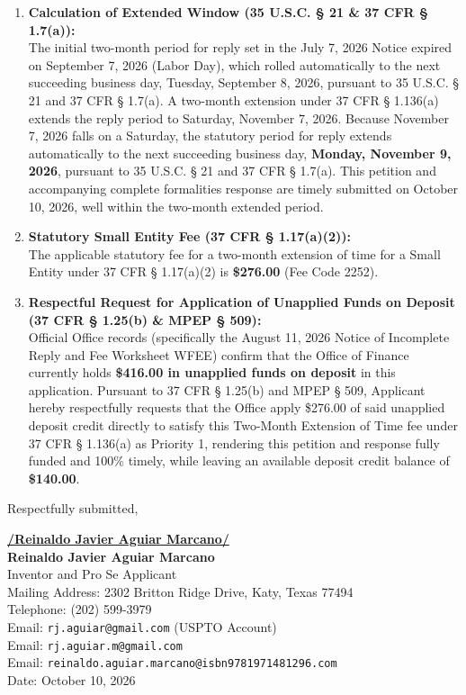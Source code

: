 \documentclass[11pt,letterpaper]{article}
\begin{document}
\begin{enumerate}[leftmargin=*]
    \item \textbf{Calculation of Extended Window (35 U.S.C. \S{} 21 \& 37 CFR \S{} 1.7(a)):} \\
    The initial two-month period for reply set in the July 7, 2026 Notice expired on September 7, 2026 (Labor Day), which rolled automatically to the next succeeding business day, Tuesday, September 8, 2026, pursuant to 35 U.S.C. \S{} 21 and 37 CFR \S{} 1.7(a). A two-month extension under 37 CFR \S{} 1.136(a) extends the reply period to Saturday, November 7, 2026. Because November 7, 2026 falls on a Saturday, the statutory period for reply extends automatically to the next succeeding business day, \textbf{Monday, November 9, 2026}, pursuant to 35 U.S.C. \S{} 21 and 37 CFR \S{} 1.7(a). This petition and accompanying complete formalities response are timely submitted on October 10, 2026, well within the two-month extended period.

    \item \textbf{Statutory Small Entity Fee (37 CFR \S{} 1.17(a)(2)):} \\
    The applicable statutory fee for a two-month extension of time for a Small Entity under 37 CFR \S{} 1.17(a)(2) is \textbf{\$276.00} (Fee Code 2252).

    \item \textbf{Respectful Request for Application of Unapplied Funds on Deposit (37 CFR \S{} 1.25(b) \& MPEP \S{} 509):} \\
    Official Office records (specifically the August 11, 2026 Notice of Incomplete Reply and Fee Worksheet WFEE) confirm that the Office of Finance currently holds \textbf{\$416.00 in unapplied funds on deposit} in this application. Pursuant to 37 CFR \S{} 1.25(b) and MPEP \S{} 509, Applicant hereby respectfully requests that the Office apply \$276.00 of said unapplied deposit credit directly to satisfy this Two-Month Extension of Time fee under 37 CFR \S{} 1.136(a) as Priority 1, rendering this petition and response fully funded and 100\% timely, while leaving an available deposit credit balance of \textbf{\$140.00}.
\end{enumerate}

\vspace{0.6cm}
\begin{singlespace}
\noindent Respectfully submitted, \par\vspace{0.8cm}
\underline{\textbf{/Reinaldo Javier Aguiar Marcano/}} \\
\textbf{Reinaldo Javier Aguiar Marcano} \\
Inventor and Pro Se Applicant \\
Mailing Address: 2302 Britton Ridge Drive, Katy, Texas 77494 \\
Telephone: (202) 599-3979 \\
Email: \texttt{rj.aguiar@gmail.com} (USPTO Account) \\
Email: \texttt{rj.aguiar.m@gmail.com} \\
Email: \texttt{reinaldo.aguiar.marcano@isbn9781971481296.com} \\
Date: October 10, 2026
\end{singlespace}
\end{document}
